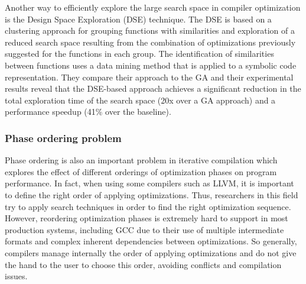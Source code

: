 Another way to efficiently explore the large search space in compiler optimization is the Design Space Exploration (DSE) technique\cite{martins2014exploration,martins2016clustering}. The DSE is based on a clustering approach for grouping functions with similarities and exploration of a reduced search space resulting from the combination of optimizations previously suggested for the functions in each group.
The identification of similarities between functions uses a data mining method that is applied to a symbolic code representation.
They compare their approach to the GA and their experimental results reveal that the DSE-based approach achieves a significant reduction in the total exploration time of the search space (20x over a GA approach) and a performance speedup (41\% over the baseline). 




\subsubsection{Phase ordering problem}
Phase ordering is also an important problem in iterative compilation which explores the effect of different orderings of optimization phases on program performance. In fact, when using some compilers such as LLVM, it is important to define the right order of applying optimizations. Thus, researchers in this field try to apply search techniques in order to find the right optimization sequence. However, reordering optimization phases is extremely hard to support in most production systems, including GCC due to their use of multiple intermediate formats and complex inherent dependencies between optimizations. So generally, compilers manage internally the order of applying optimizations and do not give the hand to the user to choose this order, avoiding conflicts and compilation issues.

